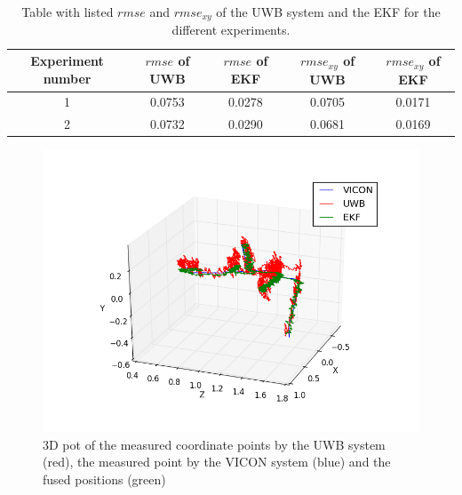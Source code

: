 \begin{table}[ht!]
\begin{center}
\begin{tabular}{c|c|c|c|c}
	Experiment number & $\textit{rmse}$ of \ac{UWB} & $\textit{rmse}$ of \ac{EKF} & $\textit{rmse}_{xy}$ of \ac{UWB} & $\textit{rmse}_{xy}$ of \ac{EKF}\\ 
	\hline 
	1 & 0.0753 & 0.0278 & 0.0705 & 0.0171 \\
	2 & 0.0732 & 0.0290 & 0.0681 & 0.0169 \\ 
\end{tabular}
\end{center}
\caption{Table with listed $\textit{rmse}$ and $\textit{rmse}_{xy}$ of the \ac{UWB} system and the \ac{EKF} for the different experiments.}
\label{tab:results}
\end{table}

\begin{figure}[ht!]\centering
	\includegraphics[width=1.0\textwidth]{figures/evaluation}
	\caption{3D pot of the measured coordinate points by the \ac{UWB} system (red), the measured point by the VICON system (blue) and the fused positions (green)}\label{fig:evaluation}
\end{figure}
